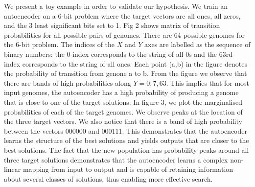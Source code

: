 \documentclass[runningheads,a4paper]{llncs}
\begin{document}
 


We present a toy example in order to validate our hypothesis. We train an autoencoder on a 6-bit problem where the target vectors are all ones, all zeros, and the 3 least significant bits set to 1. Fig 2 shows matrix of transition probabilities for all possible pairs of genomes. There are 64 possible genomes for the 6-bit problem. The indices of the $X$ and $Y$ axes are labelled as the sequence of binary numbers: the 0-index corresponds to the string of all 0s and the 63rd index corresponds to the string of all ones. Each point (a,b) in the figure denotes the probability of transition from genone a to b. From the figure we observe that there are bands of high probabilities along $Y=0,7,63$. This implies that for most input genomes, the autoencoder has a high probability of producing a genome that is close to one of the target solutions. In figure 3, we plot the marginalised probabilities of each of the target genomes. We observe peaks at the location of the three target vectors. We also notice that there is a band of high probability between the vectors 000000 and 000111. This demonstrates that the autoencoder learns the structure of the best solutions and yields outputs that are closer to the best solutions. The fact that the new population has probability peaks around all three target solutions demonstrates that the autoencoder learns a complex non-linear mapping from input to output and is capable of retaining information about several classes of solutions, thus enabling more effective search.  
\end{document}
